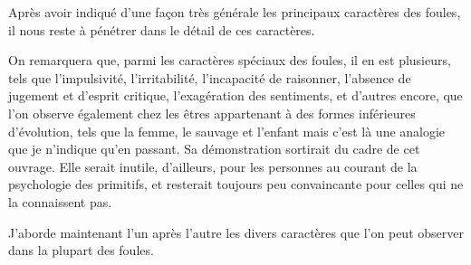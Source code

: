 \documentclass[french,twoside]{book} %
\begin{document}
\noindent Après avoir indiqué d’une façon très générale les principaux caractères des foules, il nous reste à pénétrer dans le détail de ces caractères.\par
On remarquera que, parmi les caractères spéciaux des foules, il en est plusieurs, tels que l’impulsivité, l’irritabilité, l’incapacité de raisonner, l’absence de jugement et d’esprit critique, l’exagération des sentiments, et d’autres encore, que l’on observe également chez les êtres appartenant à des formes inférieures d’évolution, tels que la femme, le sauvage et l’enfant mais c’est là une analogie que je n’indique qu’en passant. Sa démonstration sortirait du cadre de cet ouvrage. Elle serait inutile, d’ailleurs, pour les personnes au courant de la psychologie des primitifs, et resterait toujours peu convaincante pour celles qui ne la connaissent pas.\par
J’aborde maintenant l’un après l’autre les divers caractères que l’on peut observer dans la plupart des foules.\par
\end{document}
